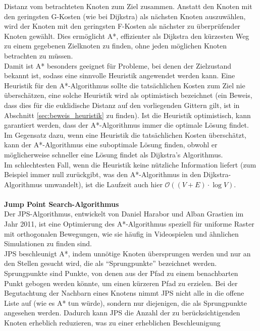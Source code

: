 \begin{itemize}
    Distanz vom betrachteten Knoten zum Ziel zusammen.
    Anstatt den Knoten mit den geringsten G-Kosten (wie bei Dijkstra) als nächsten Knoten auszuwählen, wird der
    Knoten mit den geringsten F-Kosten als nächster zu überprüfender Knoten gewählt.
    Dies ermöglicht A*, effizienter als Dijkstra den kürzesten Weg zu einem gegebenen Zielknoten zu finden, ohne jeden
    möglichen Knoten betrachten zu müssen.\\
    Damit ist A* besonders geeignet für Probleme, bei denen der Zielzustand bekannt ist, sodass eine sinnvolle Heuristik angewendet werden kann. \cite{hart1968}
    Eine Heuristik für den A*-Algorithmus sollte die tatsächlichen Kosten zum Ziel nie überschätzen, eine solche Heuristik
    wird als optimistisch bezeichnet (ein Beweis, dass dies für die euklidische Distanz auf den vorliegenden Gittern gilt, ist in Abschnitt \ref{sec:beweis_heuristik} zu finden).
    Ist die Heuristik optimistisch, kann garantiert werden, dass der A*-Algorithmus immer die optimale Lösung findet.
    Im Gegensatz dazu, wenn eine Heuristik die tatsächlichen Kosten überschätzt, kann der A*-Algorithmus eine suboptimale
    Lösung finden, obwohl er möglicherweise schneller eine Lösung findet als Dijkstra's Algorithmus.\\
    Im schlechtesten Fall, wenn die Heuristik keine nützliche Information liefert (zum Beispiel immer null zurückgibt, was den
    A*-Algorithmus in den Dijkstra-Algorithmus umwandelt), ist die Laufzeit auch hier $\mathcal{O}((V+E)\cdot\log V)$.\\\\
    \textbf{Jump Point Search-Algorithmus}\\
    Der  \ac{JPS}-Algorithmus, entwickelt von Daniel Harabor und Alban Grastien im Jahr 2011, ist eine Optimierung des
    A*-Algorithmus speziell für uniforme Raster mit orthogonalen Bewegungen, wie sie häufig in Videospielen und ähnlichen
    Simulationen zu finden sind. \cite{harabor2011}\\
    \ac{JPS} beschleunigt A*, indem unnötige Knoten übersprungen werden und nur an den Stellen gesucht wird, die als ``Sprungpunkte'' bezeichnet werden.
    Sprungpunkte sind Punkte, von denen aus der Pfad zu einem benachbarten Punkt gebogen werden könnte, um einen kürzeren Pfad zu erzielen.
    Bei der Begutachtung der Nachbarn eines Knotens nimmt JPS nicht alle in die offene Liste auf (wie es A* tun würde),
    sondern nur diejenigen, die als Sprungpunkte angesehen werden.
    Dadurch kann JPS die Anzahl der zu berücksichtigenden Knoten erheblich reduzieren, was zu einer erheblichen Beschleunigung

\end{itemize}
